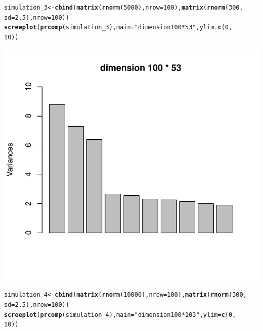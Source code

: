 \documentclass{article}\usepackage[]{graphicx}\usepackage[]{color}
\makeatletter
\def\maxwidth{ %
  \ifdim\Gin@nat@width>\linewidth
    \linewidth
  \else
    \Gin@nat@width
  \fi
}
\newcommand{\hlnum}[1]{\textcolor[rgb]{0.686,0.059,0.569}{#1}}%
\newcommand{\hlstr}[1]{\textcolor[rgb]{0.192,0.494,0.8}{#1}}%
\newcommand{\hlstd}[1]{\textcolor[rgb]{0.345,0.345,0.345}{#1}}%
\newcommand{\hlkwb}[1]{\textcolor[rgb]{0.69,0.353,0.396}{#1}}%
\newcommand{\hlkwc}[1]{\textcolor[rgb]{0.333,0.667,0.333}{#1}}%
\newcommand{\hlkwd}[1]{\textcolor[rgb]{0.737,0.353,0.396}{\textbf{#1}}}%
\newenvironment{kframe}{%
 \def\at@end@of@kframe{}%
 \ifinner\ifhmode%
  \def\at@end@of@kframe{\end{minipage}}%
  \begin{minipage}{\columnwidth}%
 \fi\fi%
 \def\FrameCommand##1{\hskip\@totalleftmargin \hskip-\fboxsep
 \colorbox{shadecolor}{##1}\hskip-\fboxsep
     \hskip-\linewidth \hskip-\@totalleftmargin \hskip\columnwidth}%
 \MakeFramed {\advance\hsize-\width
   \@totalleftmargin\z@ \linewidth\hsize
   \@setminipage}}%
 {\par\unskip\endMakeFramed%
 \at@end@of@kframe}
\newenvironment{knitrout}{}{} %
\makeatother
\begin{document}
\begin{knitrout}
{}


\begin{kframe}\begin{alltt}
\hlstd{simulation_3} \hlkwb{<-} \hlkwd{cbind}\hlstd{(}\hlkwd{matrix}\hlstd{(}\hlkwd{rnorm}\hlstd{(}\hlnum{5000}\hlstd{),} \hlkwc{nrow} \hlstd{=} \hlnum{100}\hlstd{),} \hlkwd{matrix}\hlstd{(}\hlkwd{rnorm}\hlstd{(}\hlnum{300}\hlstd{,}
    \hlkwc{sd} \hlstd{=} \hlnum{2.5}\hlstd{),} \hlkwc{nrow} \hlstd{=} \hlnum{100}\hlstd{))}
\hlkwd{screeplot}\hlstd{(}\hlkwd{prcomp}\hlstd{(simulation_3),} \hlkwc{main} \hlstd{=} \hlstr{"dimension 100 * 53"}\hlstd{,} \hlkwc{ylim} \hlstd{=} \hlkwd{c}\hlstd{(}\hlnum{0}\hlstd{,}
    \hlnum{10}\hlstd{))}
\end{alltt}
\end{kframe}

{\centering \includegraphics[width=\maxwidth]{figure/minimal-Problem_54} 

}


\begin{kframe}\begin{alltt}
\hlstd{simulation_4} \hlkwb{<-} \hlkwd{cbind}\hlstd{(}\hlkwd{matrix}\hlstd{(}\hlkwd{rnorm}\hlstd{(}\hlnum{10000}\hlstd{),} \hlkwc{nrow} \hlstd{=} \hlnum{100}\hlstd{),} \hlkwd{matrix}\hlstd{(}\hlkwd{rnorm}\hlstd{(}\hlnum{300}\hlstd{,}
    \hlkwc{sd} \hlstd{=} \hlnum{2.5}\hlstd{),} \hlkwc{nrow} \hlstd{=} \hlnum{100}\hlstd{))}
\hlkwd{screeplot}\hlstd{(}\hlkwd{prcomp}\hlstd{(simulation_4),} \hlkwc{main} \hlstd{=} \hlstr{"dimension 100 * 103"}\hlstd{,} \hlkwc{ylim} \hlstd{=} \hlkwd{c}\hlstd{(}\hlnum{0}\hlstd{,}
    \hlnum{10}\hlstd{))}
\end{alltt}
\end{kframe}


\end{knitrout}
\end{document}
